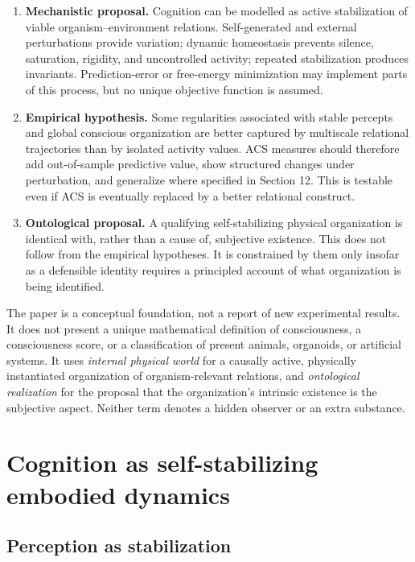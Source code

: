 \documentclass[
  11pt,
  a4paper,
]{article}
\begin{document}
\begin{enumerate}
\def\labelenumi{\arabic{enumi}.}
\item
  \textbf{Mechanistic proposal.} Cognition can be modelled as active
  stabilization of viable organism--environment relations.
  Self-generated and external perturbations provide variation; dynamic
  homeostasis prevents silence, saturation, rigidity, and uncontrolled
  activity; repeated stabilization produces invariants. Prediction-error
  or free-energy minimization may implement parts of this process, but
  no unique objective function is assumed.
\item
  \textbf{Empirical hypothesis.} Some regularities associated with
  stable percepts and global conscious organization are better captured
  by multiscale relational trajectories than by isolated activity
  values. ACS measures should therefore add out-of-sample predictive
  value, show structured changes under perturbation, and generalize
  where specified in Section 12. This is testable even if ACS is
  eventually replaced by a better relational construct.
\item
  \textbf{Ontological proposal.} A qualifying self-stabilizing physical
  organization is identical with, rather than a cause of, subjective
  existence. This does not follow from the empirical hypotheses. It is
  constrained by them only insofar as a defensible identity requires a
  principled account of what organization is being identified.
\end{enumerate}

The paper is a conceptual foundation, not a report of new experimental
results. It does not present a unique mathematical definition of
consciousness, a consciousness score, or a classification of present
animals, organoids, or artificial systems. It uses \emph{internal
physical world} for a causally active, physically instantiated
organization of organism-relevant relations, and \emph{ontological
realization} for the proposal that the organization's intrinsic
existence is the subjective aspect. Neither term denotes a hidden
observer or an extra substance.

\section{Cognition as self-stabilizing embodied
dynamics}\label{cognition-as-self-stabilizing-embodied-dynamics}

\subsection{Perception as
stabilization}\label{perception-as-stabilization}
\end{document}
